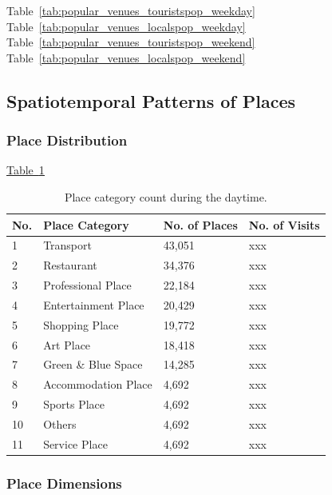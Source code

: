 \documentclass{article}
\begin{document}
Table~\ref{tab:popular_venues_touristspop_weekday}
Table~\ref{tab:popular_venues_localspop_weekday}
Table~\ref{tab:popular_venues_touristspop_weekend}
Table~\ref{tab:popular_venues_localspop_weekend}


\subsection{Spatiotemporal Patterns of Places}


\subsubsection{Place Distribution}

\underline{Table~\ref{tab:place_category_daytime}}

\begin{table}[!h]
\centering
\caption{\label{tab:place_category_daytime}Place category count during the daytime.}
\begin{tabular}{llll} \hline
No. & Place Category & No. of Places & No. of Visits \\ \hline
1 & Transport & 43,051 & xxx \\
2 & Restaurant & 34,376 & xxx \\
3 & Professional Place & 22,184 & xxx \\
4 & Entertainment Place & 20,429 & xxx \\
5 & Shopping Place & 19,772 & xxx \\
6 & Art Place & 18,418 & xxx \\
7 & Green \& Blue Space & 14,285 & xxx \\
8 & Accommodation Place & 4,692 & xxx \\
9 & Sports Place & 4,692 & xxx \\
10 & Others & 4,692 & xxx \\
11 & Service Place & 4,692 & xxx \\ \hline
\end{tabular}
\end{table}

\subsubsection{Place Dimensions}
\end{document}
